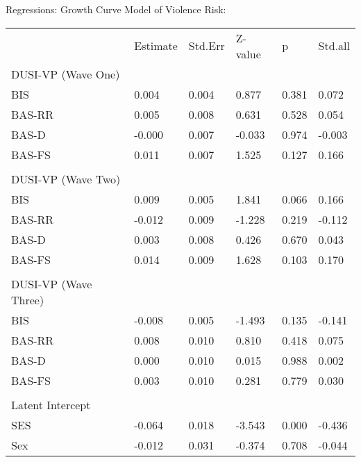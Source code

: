 \documentclass[utf8]{article}
\begin{document}
Regressions: Growth Curve Model of Violence Risk:
\begin{table}[]
\begin{tabular}{llllll}
                     & Estimate & Std.Err & Z-value & p     & Std.all \\
DUSI-VP (Wave One)   &          &         &         &       &         \\
BIS                  & 0.004    & 0.004   & 0.877   & 0.381 & 0.072   \\
BAS-RR               & 0.005    & 0.008   & 0.631   & 0.528 & 0.054   \\
BAS-D                & -0.000   & 0.007   & -0.033  & 0.974 & -0.003  \\
BAS-FS               & 0.011    & 0.007   & 1.525   & 0.127 & 0.166   \\
                     &          &         &         &       &         \\
DUSI-VP (Wave Two)   &          &         &         &       &         \\
BIS                  & 0.009    & 0.005   & 1.841   & 0.066 & 0.166   \\
BAS-RR               & -0.012   & 0.009   & -1.228  & 0.219 & -0.112  \\
BAS-D                & 0.003    & 0.008   & 0.426   & 0.670 & 0.043   \\
BAS-FS               & 0.014    & 0.009   & 1.628   & 0.103 & 0.170   \\
                     &          &         &         &       &         \\
DUSI-VP (Wave Three) &          &         &         &       &         \\
BIS                  & -0.008   & 0.005   & -1.493  & 0.135 & -0.141  \\
BAS-RR               & 0.008    & 0.010   & 0.810   & 0.418 & 0.075   \\
BAS-D                & 0.000    & 0.010   & 0.015   & 0.988 & 0.002   \\
BAS-FS               & 0.003    & 0.010   & 0.281   & 0.779 & 0.030   \\
                     &          &         &         &       &         \\
Latent Intercept     &          &         &         &       &         \\
SES                  & -0.064   & 0.018   & -3.543  & 0.000 & -0.436  \\
Sex                  & -0.012   & 0.031   & -0.374  & 0.708 & -0.044  \\

\end{tabular}
\end{table}
\end{document}
